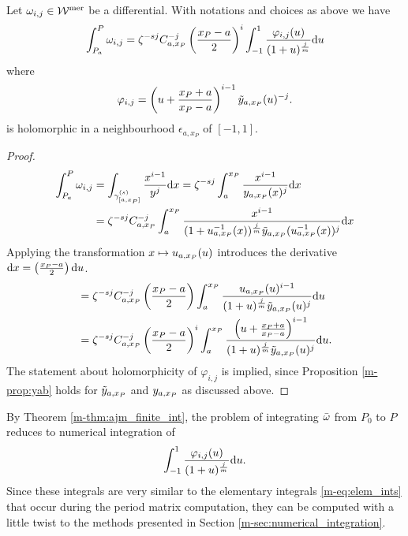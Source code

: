 \documentclass[main.tex]{subfiles}
\begin{document}
  \begin{thm}\label{thm:ajm_finite_int}
  Let $\omega_{i,j} \in \mathcal{W}^{\text{mer}}$ be a differential. With notations and choices as above we have
 \begin{equation}\label{eq:aj_int}
       \int_{P_a}^P \omega_{i,j} = \zeta^{-sj} C_{a,x_P}^{-j} \left(\frac{x_P-a}{2}\right)^i \int_{-1}^1 \frac{\varphi_{i,j}(u)}{(1+u)^{\frac{j}{m}}}  \mathrm d u
  \end{equation}
   where
   \begin{equation}
    \varphi_{i,j}  = \left(u+\frac{x_P+a}{x_P-a}\right)^{i-1} \tilde{y}_{a,x_P}(u)^{-j}.
   \end{equation}
   is holomorphic in a neighbourhood $\epsilon_{a,x_P}$ of $[-1,1]$.
  \end{thm}
  \begin{proof}
    \begin{align}
     \int_{P_a}^P \omega_{i,j}  & =  \int_{\gamma^{(s)}_{[a,x_P]}} \frac{x^{i-1}}{y^j}  \mathrm d x  =  \zeta^{-sj} \int_a^{x_P} \frac{x^{i-1}}{y_{a,x_P}(x)^j}  \mathrm d x \\  & = 
     \zeta^{-sj} C_{a,x_P}^{-j}  \int_a^{x_P} \frac{x^{i-1}}{(1+u_{a,x_P}^{-1}(x))^{\frac{j}{m}}\tilde{y}_{a,x_P}(u_{a,x_P}^{-1}(x))^j}  \mathrm d x
  \end{align}
   Applying the transformation $x \mapsto u_{a,x_P}(u)$ introduces the derivative $\mathrm d x = \left(\frac{x_P-a}{2}\right) \mathrm d u$.
  \begin{align}
   & =  \zeta^{-sj} C_{a,x_P}^{-j} \left(\frac{x_P-a}{2}\right) \int_a^{x_P} \frac{u_{a,x_P}(u)^{i-1}}{(1+u)^{\frac{j}{m}}\tilde{y}_{a,x_P}(u)^j}  \mathrm d u \\ & =
   \zeta^{-sj} C_{a,x_P}^{-j} \left(\frac{x_P-a}{2}\right)^i \int_a^{x_P} \frac{\left(u + \frac{x_P+a}{x_P-a}\right)^{i-1}}{(1+u)^{\frac{j}{m}}\tilde{y}_{a,x_P}(u)^j}  \mathrm d u.
  \end{align}
  The statement about holomorphicity of $\varphi_{i,j}$ is implied, since Proposition \ref{m-prop:yab} holds for $\tilde{y}_{a,x_P}$ and $y_{a,x_P}$ as discussed above.
  \end{proof}

  \begin{rmk}\label{rmk:ajm_finite_int}
   By Theorem \ref{m-thm:ajm_finite_int}, the problem of integrating $\bar{\omega}$ from $P_0$ to $P$ reduces to numerical integration of
    \begin{equation}
       \int_{-1}^1 \frac{\varphi_{i,j}(u)}{(1+u)^{\frac{j}{m}}}  \mathrm d u.
   \end{equation}
   Since these integrals are very similar to the elementary integrals \eqref{m-eq:elem_ints} that occur during the period matrix computation, they can be computed with a little twist to
   the methods presented in Section \ref{m-sec:numerical_integration}.
   \end{rmk}
\end{document}
